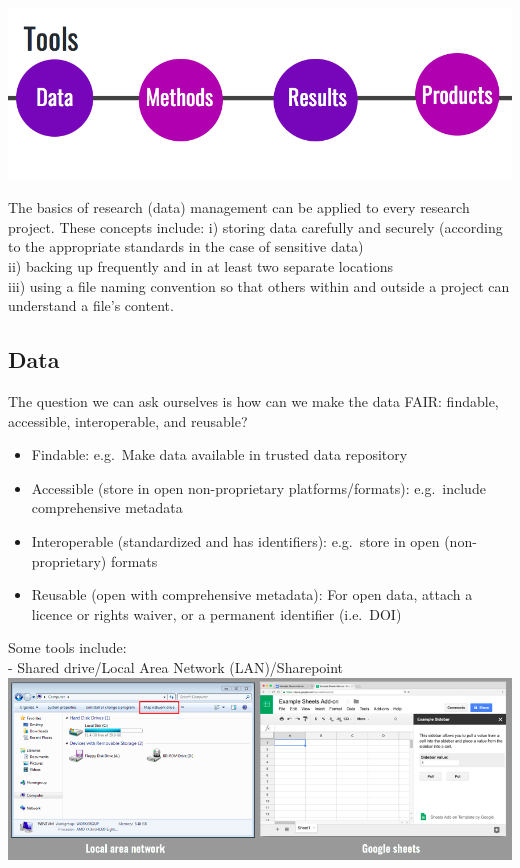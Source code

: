 \documentclass[
]{book}
\providecommand{\tightlist}{%
  \setlength{\itemsep}{0pt}\setlength{\parskip}{0pt}}
\begin{document}
\includegraphics{rr-presentation-figure/tools.png}

The basics of research (data) management can be applied to every research project. These concepts include:
i) storing data carefully and securely (according to the appropriate standards in the case of sensitive data)\\
ii) backing up frequently and in at least two separate locations\\
iii) using a file naming convention so that others within and outside a project can understand a file's content.

\hypertarget{data}{%
\subsection{Data}\label{data}}

The question we can ask ourselves is how can we make the data FAIR: findable, accessible, interoperable, and reusable?

\begin{itemize}
\tightlist
\item
  Findable: e.g.~Make data available in trusted data repository\\
\item
  Accessible (store in open non-proprietary platforms/formats): e.g.~include comprehensive metadata
\item
  Interoperable (standardized and has identifiers): e.g.~store in open (non-proprietary) formats
\item
  Reusable (open with comprehensive metadata): For open data, attach a licence or rights waiver, or a permanent identifier (i.e.~DOI)
\end{itemize}

Some tools include:\\
- Shared drive/Local Area Network (LAN)/Sharepoint\\
\includegraphics{rr-presentation-figure/LAN.png}
\end{document}
